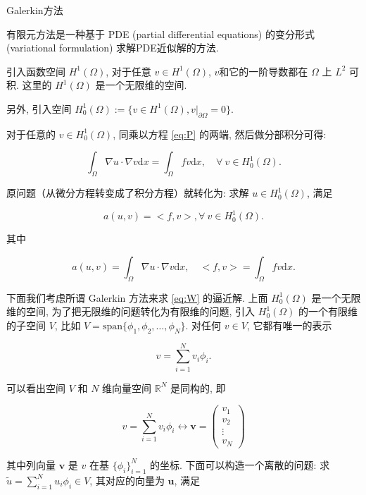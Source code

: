 \documentclass{article}
\begin{document}
{\large Galerkin方法}

有限元方法是一种基于 PDE (partial differential equations) 的变分形式 (variational formulation) 求解PDE近似解的方法.

引入函数空间 $H^1(\Omega)$, 对于任意 $v \in H^1(\Omega)$, $v$和它的一阶导数都在 $\Omega$ 上 $L^2$ 可积. 这里的 $H^1(\Omega)$ 是一个无限维的空间.

另外, 引入空间 $H^1_0(\Omega) := \{v\in H^1(\Omega), v|_{\partial\Omega} = 0\}$.

对于任意的 $v\in H^1_0(\Omega)$, 同乘以方程 \eqref{eq:P} 的两端, 然后做分部积分可得: 

\begin{equation}\label{eq:wg}
\int_{\Omega}\nabla u\cdot\nabla v\mathrm{d}x = \int_{\Omega}fv\mathrm{d}x,\quad\forall~ v \in H^1_0(\Omega).
\end{equation}

原问题（从微分方程转变成了积分方程）就转化为: 求解 $u\in H_0^1(\Omega)$, 满足

\begin{equation}\label{eq:W}
a(u,v) = <f,v>,\forall~ v\in H_0^1(\Omega).
\end{equation}

其中

$$
a(u,v) = \int_{\Omega}\nabla u\cdot\nabla v\mathrm{d}x,\quad <f,v> =  \int_{\Omega}fv\mathrm{d}x.
$$


下面我们考虑所谓 Galerkin 方法来求 \eqref{eq:W} 的逼近解. 上面 $H_0^1(\Omega)$ 是一个无限维的空间,
为了把无限维的问题转化为有限维的问题, 引入 $H_0^1(\Omega)$ 的一个有限维的子空间 $V$, 比如
$V=\mathrm{span}\{\phi_1,\phi_2,\ldots,\phi_N\}$. 对任何 $v \in V$, 它都有唯一的表示

$$
v = \sum\limits_{i=1}^N v_i\phi_i.
$$

可以看出空间 $V$ 和 $N$ 维向量空间 $\mathbb{R}^N$ 是同构的, 即

$$
v = \sum\limits_{i=1}^N v_i\phi_i\leftrightarrow\mathbf{v} =
\begin{pmatrix}
v_1 \\ v_2 \\ \vdots \\ v_N
\end{pmatrix}
$$

其中列向量 $\mathbf{v}$ 是 $v$ 在基 $\{\phi_i\}_{i=1}^N$ 的坐标.
下面可以构造一个离散的问题: 求 $ \tilde u = \sum_{i=1}^{N}u_i \phi_i \in V$, 其对应的向量为 $\mathbf u$, 满足
\end{document}
